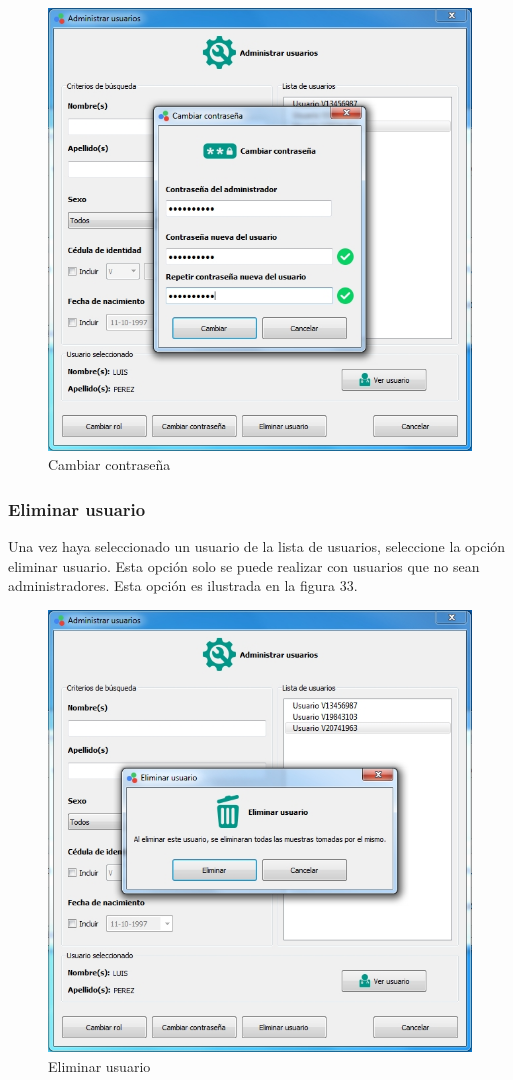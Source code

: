 \begin{figure}[H]
  \centering
  \includegraphics[width=1\linewidth]{./img/administrar-clave.jpg}
\caption{Cambiar contrase\~{n}a}
\end{figure}
		
		\subsubsection{Eliminar usuario}
		
		Una vez haya seleccionado un usuario de la lista de usuarios, seleccione la opci\'{o}n eliminar usuario. Esta opci\'{o}n solo se puede realizar con usuarios que no sean administradores. Esta opci\'{o}n es ilustrada en la figura 33.
		
\begin{figure}[H]
  \centering
  \includegraphics[width=1\linewidth]{./img/administrar-eliminar.jpg}
\caption{Eliminar usuario}
\end{figure}